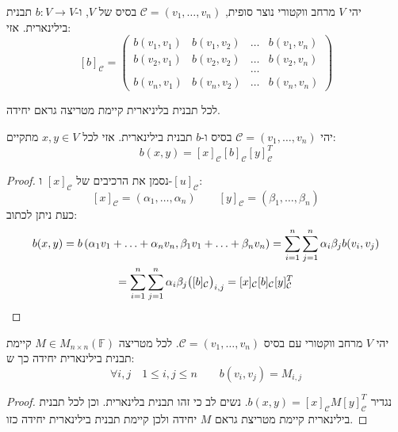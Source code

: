 \documentclass{tstextbook}
\begin{document}
\begin{definition}
יהי \(V\) מרחב ווקטורי נוצר סופית, \(\mathcal{C}=\left( v_{1},\dots,v_{n} \right)\) בסיס של \(V\), ו-\(b:V\to V\) תבנית בילינארית. אזי:
$$[b]_{\mathcal{C} }=\begin{pmatrix}b(v_{1},v_{1})&b(v_{1},v_{2})&\dots&b(v_{1},v_{n})\\ b(v_{2},v_{1})&b(v_{2},v_{2})&\dots&b(v_{2},v_{n})\\ &&\dots\\ b(v_{n},v_{1})&b(v_{n},v_{2})&\dots&b(v_{n},v_{n})\end{pmatrix}$$

\end{definition}
\begin{corollary}
לכל תבנית בליניארית קיימת מטריצה גראם יחידה.

\end{corollary}
\begin{proposition}
יהי \(\mathcal{C}=\left( v_{1},\dots,v_{n} \right)\)  בסיס ו-\(b\) תבנית בילינארית. אזי לכל \(x,y \in V\) מתקיים:
$$b(x,y)=[x]_{\mathcal{C}}[b]_{\mathcal{C}}[y]_{\mathcal{C}}^{T}$$

\end{proposition}
\begin{proof}
נסמן את הרכיבים של \([x]_{\mathcal{C}}\) ו-\([u]_{\mathcal{C}}\):
$$[x]_{\mathcal{C}}=\left( \alpha_{1},\ldots,\alpha_{n} \right)\qquad [y]_{\mathcal{C}}=\left( \beta_{1},\ldots,\beta_{n} \right)$$
כעת ניתן לכתוב:
$$\begin{gather}b(x,y)=b\left( \alpha_{1}v_{1}+\ldots+\alpha_{n}v_{n},\beta_{1}v_{1}+\ldots+\beta_{n}v_{n} \right)=\sum_{i=1}^{n}\sum_{j=1}^{n}\alpha_{i}\beta_{j}b(v_{i},v_{j})  \\=\sum_{i=1}^{n}\sum_{j=1}^{n}\alpha_{i}\beta_{j}\big{(}[b]_{\mathcal{C}}\big{)}_{i,j}=[x]_{\mathcal{C}}[b]_{\mathcal{C}}[y]_{\mathcal{C}}^{T}
\end{gather}$$

\end{proof}
\begin{corollary}
יהי \(V\) מרחב ווקטורי עם בסיס \(\mathcal{C}=\left( v_{1},\dots,v_{n} \right)\). לכל מטריצה \(M \in M_{n\times n}\left( \mathbb{F}  \right)\) קיימת תבנית בילינארית יחידה כך ש:
$$\forall i,j\quad  1\leq i,j\leq n\qquad b(v_{i},v_{j})=M_{i,j}$$

\end{corollary}
\begin{proof}
נגדיר \(b(x,y)=[x]_{\mathcal{C}}M[y]_{\mathcal{C}}^{T}\). נשים לב כי זהו תבנית בלינארית. וכן לכל תבנית בילינארית קיימת מטריצת גראם \(M\) יחידה ולכן קיימת תבנית בילינארית יחידה כזו.

\end{proof}
\end{document}
